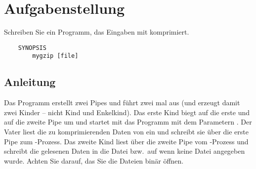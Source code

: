 




\section*{Aufgabenstellung}
Schreiben Sie ein Programm, das Eingaben mit  komprimiert.

\begin{verbatim}
    SYNOPSIS
        mygzip [file]
\end{verbatim}


\subsection*{Anleitung}
Das Programm erstellt zwei Pipes und führt zwei mal  aus (und erzeugt damit zwei Kinder – nicht Kind und Enkelkind).
Das erste Kind biegt  auf die erste und  auf die zweite Pipe um und startet mit  das Programm  mit dem Parametern .
Der Vater liest die zu komprimierenden Daten von  ein und schreibt sie über die erste Pipe zum -Prozess.
Das zweite Kind liest über die zweite Pipe vom -Prozess und schreibt die gelesenen Daten in die Datei  bzw.\ auf  wenn keine Datei angegeben wurde.
Achten Sie darauf, das Sie die Dateien binär öffnen.

\osueguidelinestwo


